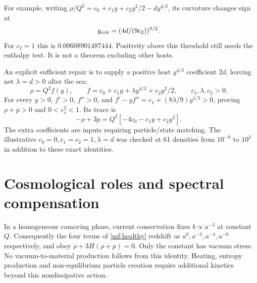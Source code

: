 \documentclass[11pt]{article}
\begin{document}
For example, writing $\rho/Q^2=c_0+c_1 y+c_2 y^2/2-d y^{4/3}$,
its curvature changes sign at
\begin{equation}
 y_{\rm crit}=(4d/(9c_2))^{3/2}.
\end{equation}
For $c_2=1$ this is $0.00608901487444$. Positivity above this threshold
still needs the enthalpy test. It is not a theorem excluding other hosts.

An explicit sufficient repair is to supply a positive host $y^{4/3}$
coefficient $2d$, leaving net $\lambda=d>0$ after the sea:
\begin{equation}
 \rho=Q^2 f(y),\qquad
 f=c_0+c_1 y+\lambda y^{4/3}+c_2y^2/2,
 \qquad c_1,\lambda,c_2>0.
 \label{mf:healthy}
\end{equation}
For every $y>0$, $f'>0$, $f''>0$, and
$f'-yf''=c_1+(8\lambda/9)y^{1/3}>0$, proving
$\rho+p>0$ and $0<c_s^2<1$. Its trace is
\begin{equation}
 -\rho+3p=Q^2[-4c_0-c_1 y+c_2 y^2].
\end{equation}
The extra coefficients are inputs requiring particle/state matching.
The illustrative $c_0=0,c_1=c_2=1,\lambda=d$ was checked at 61 densities
from $10^{-9}$ to $10^3$ in addition to these exact identities.

\section{Cosmological roles and spectral compensation}
In a homogeneous comoving phase, current conservation fixes
$b\propto a^{-3}$ at constant $Q$. Consequently the four terms of
\eqref{mf:healthy} redshift as $a^0,a^{-3},a^{-4},a^{-6}$ respectively,
and obey $\dot\rho+3H(\rho+p)=0$. Only the constant has vacuum stress.
No vacuum-to-material production follows from this identity. Heating,
entropy production and non-equilibrium particle creation require additional
kinetics beyond this nondissipative action.
\end{document}
